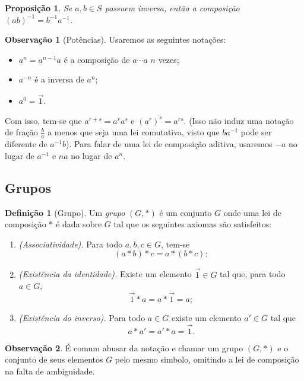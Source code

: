 \documentclass[a4paper,12pt]{report}
\theoremstyle{plain}
\newtheorem{proposicao}{Proposição}[section]
\theoremstyle{definition}
\newtheorem{definicao}{Definição}[section]
\newtheorem{observacao}{Observação}[section]
\begin{document}
\begin{proposicao}
	Se \(a,b\in S\) possuem inversa, então a composição \((ab)^{-1} = b^{-1}a^{-1}\).
\end{proposicao}

\begin{observacao}[Potências]
	Usaremos as seguintes notações:
	\begin{itemize}
		\item \(a^n = a^{n-1}a\) é a composição de \(a\dotsb a\) \(n\) vezes;
		\item \(a^{-n}\) é a inversa de \(a^n\);
		\item \(a^0 = \vec{1}\).
	\end{itemize}

	Com isso, tem-se que \(a^{r+s} = a^ra^s\) e \((a^r)^s = a^{rs}\). (Isso
	não induz uma notação de fração \(\frac{b}{a}\) a menos que seja uma lei
	comutativa, visto que \(ba^{-1}\) pode ser diferente de \(a^{-1}b\)).
	Para falar de uma lei de composição aditiva, usaremos \(-a\) no lugar de
	\(a^{-1}\) e \(na\) no lugar de \(a^n\).
\end{observacao}

\subsection{Grupos}

\begin{definicao}[Grupo]
	
	Um \emph{grupo} $(G,*)$ é um conjunto \(G\) onde uma lei de
	composição $*$ é dada sobre \(G\) tal que os seguintes axiomas são satisfeitos:
	
	\begin{enumerate}
		\item \emph{(Associatividade).} Para todo $a,b,c \in G$, tem-se $$(a*b)*c = a*(b*c);$$
		\item \emph{(Existência da identidade).} Existe um elemento $\vec{1}\in G$ tal que, para todo $a\in G$, $$\vec{1}*a = a*\vec{1} = a;$$
		\item \emph{(Existência do inverso).} Para todo $a\in G$ existe um elemento $a'\in G$ tal que $$a*a' = a'*a = \vec{1}.$$
	\end{enumerate}
\end{definicao}

\begin{observacao}
	É comum abusar da notação e chamar um grupo $(G,*)$ e o conjunto de	seus elementos $G$ pelo mesmo simbolo, omitindo a lei de composição na falta de ambiguidade.	
\end{observacao}
\end{document}
